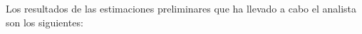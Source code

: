 \documentclass[10pt,a4paper]{article}
\begin{document}


Los resultados de las estimaciones preliminares que ha llevado a cabo
el analista son los siguientes:
\end{document}

